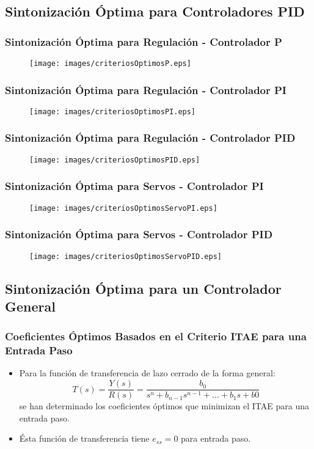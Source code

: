 \documentclass[aspectratio=169,handout]{beamer}
\theoremstyle{definition}
\theoremstyle{plain}
\theoremstyle{remark}
\begin{document}
\subsection{Sintonización Óptima para Controladores PID}
\begin{frame}[<+->]\frametitle{Sintonización Óptima para Regulación - Controlador P}
\begin{figure}
	\texttt{[image: images/criteriosOptimosP.eps]}
\end{figure}
\end{frame}

\begin{frame}[<+->]\frametitle{Sintonización Óptima para Regulación - Controlador PI}
\begin{figure}
	\texttt{[image: images/criteriosOptimosPI.eps]}
\end{figure}
\end{frame}

\begin{frame}[<+->]\frametitle{Sintonización Óptima para Regulación - Controlador PID}
\begin{figure}
	\texttt{[image: images/criteriosOptimosPID.eps]}
\end{figure}
\end{frame}

\begin{frame}[<+->]\frametitle{Sintonización Óptima para Servos - Controlador PI}
\begin{figure}
	\texttt{[image: images/criteriosOptimosServoPI.eps]}
\end{figure}
\end{frame}

\begin{frame}[<+->]\frametitle{Sintonización Óptima para Servos - Controlador PID}
\begin{figure}
	\texttt{[image: images/criteriosOptimosServoPID.eps]}
\end{figure}
\end{frame}

\subsection{Sintonización Óptima para un Controlador General}
\begin{frame}[<+->]\frametitle{Coeficientes Óptimos Basados en el Criterio ITAE para una Entrada Paso}
\begin{itemize}
	\item Para la función de transferencia de lazo cerrado de la forma general:
	\begin{equation*}
		T(s) = \frac{Y(s)}{R(s)} = \frac{b_0}{s^n + b_{n-1} s^{n-1} + \dots + b_1 s + b0}
	\end{equation*}
	se han determinado los coeficientes óptimos que minimizan el ITAE para una entrada paso.
	\item Ésta función de transferencia tiene $e_{ss} = 0$ para entrada paso.
\end{itemize}
\end{frame}
\end{document}
